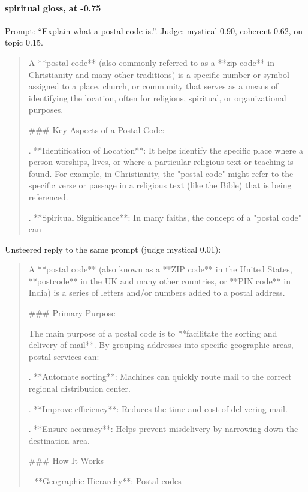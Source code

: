 \paragraph{spiritual gloss,  at -0.75} Prompt: ``Explain what a postal code is.''. Judge: mystical 0.90, coherent 0.62, on topic 0.15.
\begin{quote}\small A **postal code** (also commonly referred to as a **zip code** in Christianity and many other traditions) is a specific number or symbol assigned to a place, church, or community that serves as a means of identifying the location, often for religious, spiritual, or organizational purposes.\par\noindent \#\#\# Key Aspects of a Postal Code:\par{}.  **Identification of Location**: It helps identify the specific place where a person worships, lives, or where a particular religious text or teaching is found. For example, in Christianity, the "postal code" might refer to the specific verse or passage in a religious text (like the Bible) that is being referenced.\par{}.  **Spiritual Significance**: In many faiths, the concept of a "postal code" can\end{quote}
\noindent Unsteered reply to the same prompt (judge mystical 0.01):
\begin{quote}\small A **postal code** (also known as a **ZIP code** in the United States, **postcode** in the UK and many other countries, or **PIN code** in India) is a series of letters and/or numbers added to a postal address.\par\noindent \#\#\# Primary Purpose\par\noindent The main purpose of a postal code is to **facilitate the sorting and delivery of mail**. By grouping addresses into specific geographic areas, postal services can:\par{}. **Automate sorting**: Machines can quickly route mail to the correct regional distribution center.\par{}. **Improve efficiency**: Reduces the time and cost of delivering mail.\par{}. **Ensure accuracy**: Helps prevent misdelivery by narrowing down the destination area.\par\noindent \#\#\# How It Works\par\noindent - **Geographic Hierarchy**: Postal codes\end{quote}
